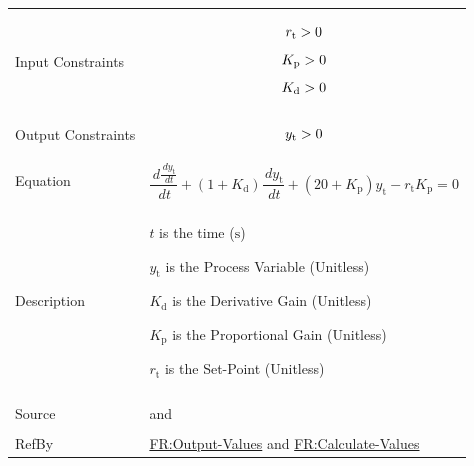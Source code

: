 \documentclass[12pt]{article}
\newcommand{\gt}{\ensuremath >}
\begin{document}
\begin{minipage}{\textwidth}
\begin{tabular}{>{\raggedright}p{}>{\raggedright\arraybackslash}p{}}
\\ \midrule \\
Input Constraints & \begin{displaymath}
                    {r_{\text{t}}}\gt{}0
                    \end{displaymath}
                    \begin{displaymath}
                    {K_{\text{p}}}\gt{}0
                    \end{displaymath}
                    \begin{displaymath}
                    {K_{\text{d}}}\gt{}0
                    \end{displaymath}
\\ \midrule \\
Output Constraints & \begin{displaymath}
                     {y_{\text{t}}}\gt{}0
                     \end{displaymath}
\\ \midrule \\
Equation & \begin{displaymath}
           \frac{\,d\frac{\,d{y_{\text{t}}}}{\,dt}}{\,dt}+\left(1+{K_{\text{d}}}\right) \frac{\,d{y_{\text{t}}}}{\,dt}+\left(20+{K_{\text{p}}}\right) {y_{\text{t}}}-{r_{\text{t}}} {K_{\text{p}}}=0
           \end{displaymath}
\\ \midrule \\
Description & \begin{symbDescription}
              \item{$t$ is the time (${\text{s}}$)}
              \item{${y_{\text{t}}}$ is the Process Variable (Unitless)}
              \item{${K_{\text{d}}}$ is the Derivative Gain (Unitless)}
              \item{${K_{\text{p}}}$ is the Proportional Gain (Unitless)}
              \item{${r_{\text{t}}}$ is the Set-Point (Unitless)}
              \end{symbDescription}
\\ \midrule \\
Source & \cite{abbasi2015} and \cite{johnson2008}
         
\\ \midrule \\
RefBy & \hyperref[outputValues]{FR:Output-Values} and \hyperref[calculateValues]{FR:Calculate-Values}
        
\\ \bottomrule
\end{tabular}
\end{minipage}
\end{document}
